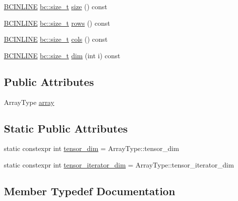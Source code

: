 \begin{DoxyCompactItemize}
\item 
\hyperlink{common_8h_a6699e8b0449da5c0fafb878e59c1d4b1}{B\+C\+I\+N\+L\+I\+NE} \hyperlink{namespacebc_aaf8e3fbf99b04b1b57c4f80c6f55d3c5}{bc\+::size\+\_\+t} \hyperlink{structbc_1_1tensors_1_1exprs_1_1Un__Op_a97ce0fcbd457f2d433fd6a83f978fba0}{size} () const
\item 
\hyperlink{common_8h_a6699e8b0449da5c0fafb878e59c1d4b1}{B\+C\+I\+N\+L\+I\+NE} \hyperlink{namespacebc_aaf8e3fbf99b04b1b57c4f80c6f55d3c5}{bc\+::size\+\_\+t} \hyperlink{structbc_1_1tensors_1_1exprs_1_1Un__Op_ac95890e4e3df7d32d197d29719d9b2a6}{rows} () const
\item 
\hyperlink{common_8h_a6699e8b0449da5c0fafb878e59c1d4b1}{B\+C\+I\+N\+L\+I\+NE} \hyperlink{namespacebc_aaf8e3fbf99b04b1b57c4f80c6f55d3c5}{bc\+::size\+\_\+t} \hyperlink{structbc_1_1tensors_1_1exprs_1_1Un__Op_a5a5fc191a679863e8f5e568201883e58}{cols} () const
\item 
\hyperlink{common_8h_a6699e8b0449da5c0fafb878e59c1d4b1}{B\+C\+I\+N\+L\+I\+NE} \hyperlink{namespacebc_aaf8e3fbf99b04b1b57c4f80c6f55d3c5}{bc\+::size\+\_\+t} \hyperlink{structbc_1_1tensors_1_1exprs_1_1Un__Op_a64c7d1f17a79e63e6fdd06be416c21c8}{dim} (int i) const
\end{DoxyCompactItemize}
\subsection*{Public Attributes}
\begin{DoxyCompactItemize}
\item 
Array\+Type \hyperlink{structbc_1_1tensors_1_1exprs_1_1Un__Op_a2d04b0d2ae3ef117dbd927887b76e985}{array}
\end{DoxyCompactItemize}
\subsection*{Static Public Attributes}
\begin{DoxyCompactItemize}
\item 
static constexpr int \hyperlink{structbc_1_1tensors_1_1exprs_1_1Un__Op_a3725d4c324ed8b84ed2523db26dad36e}{tensor\+\_\+dim} = Array\+Type\+::tensor\+\_\+dim
\item 
static constexpr int \hyperlink{structbc_1_1tensors_1_1exprs_1_1Un__Op_a28c313438989aff30cd851a2edd39f37}{tensor\+\_\+iterator\+\_\+dim} = Array\+Type\+::tensor\+\_\+iterator\+\_\+dim
\end{DoxyCompactItemize}


\subsection{Member Typedef Documentation}
\mbox{\label{structbc_1_1tensors_1_1exprs_1_1Un__Op_aabfd9e86607b84279553abb4a02dc0d0}} 

